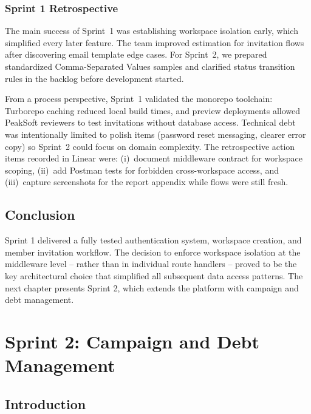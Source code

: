﻿\documentclass[12pt,a4paper]{report}
\begin{document}
\subsection{Sprint 1 Retrospective}

The main success of Sprint~1 was establishing workspace isolation early, which simplified every
later feature.
The team improved estimation for invitation flows after discovering email template edge cases.
For Sprint~2, we prepared standardized Comma-Separated Values samples and clarified status
transition rules in the backlog before development started.

From a process perspective, Sprint~1 validated the monorepo toolchain: Turborepo caching reduced
local build times, and preview deployments allowed PeakSoft reviewers to test invitations without
database access.
Technical debt was intentionally limited to polish items (password reset messaging, clearer error
copy) so Sprint~2 could focus on domain complexity.
The retrospective action items recorded in Linear were: (i)~document middleware contract for
workspace scoping, (ii)~add Postman tests for forbidden cross-workspace access, and
(iii)~capture screenshots for the report appendix while flows were still fresh.

\section*{Conclusion}
{}

Sprint 1 delivered a fully tested authentication system, workspace creation, and
member invitation workflow.
The decision to enforce workspace isolation at the middleware level -- rather than
in individual route handlers -- proved to be the key architectural choice that
simplified all subsequent data access patterns.
The next chapter presents Sprint 2, which extends the platform with campaign and
debt management.

\clearpage
\chapter{Sprint 2: Campaign and Debt Management}
\label{chap:sprint2}

\section*{Introduction}
{}
\end{document}
